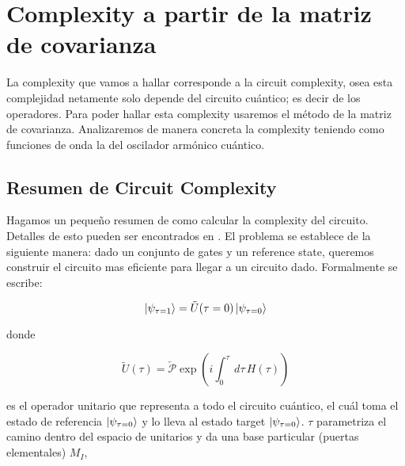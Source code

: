 \documentclass[../Main.tex]{subfiles}
\begin{document}

\section{Complexity a partir de la matriz de covarianza}

La complexity que vamos a hallar corresponde a la circuit complexity, osea esta complejidad netamente solo depende del circuito cuántico; es decir de los operadores. Para poder hallar esta complexity usaremos el método de la matriz de covarianza. Analizaremos de manera concreta la complexity teniendo como funciones de onda la del oscilador armónico cuántico.

\subsection{Resumen de Circuit Complexity}
Hagamos un pequeño resumen de como calcular la complexity del circuito. Detalles de esto pueden ser encontrados en  \citep{Jefferson_2017}. El problema se establece de la siguiente manera: dado un conjunto de gates y un reference state, queremos construir el circuito mas eficiente para llegar a un circuito dado. Formalmente se escribe:

\begin{equation}
\ket{\psi_{\tau=1}}=\tilde{U}(\tau=0)\ket{\psi_{\tau=0}}
\end{equation}

donde

\begin{equation}
\tilde U(\tau)= {\overleftarrow{\mathcal{P}}}\exp(i\int_{0}^{\tau }\, d\tau\, H(\tau))
\label{unitario}
\end{equation}

es el operador unitario que representa a todo el circuito cuántico, el cuál toma el estado de referencia $\ket{\psi_{\tau=0}}$ y lo lleva al estado target $\ket{\psi_{\tau=0}}$. $\tau$ parametriza el camino dentro del espacio de unitarios y da una base particular (puertas elementales) $M_I$,
\end{document}

